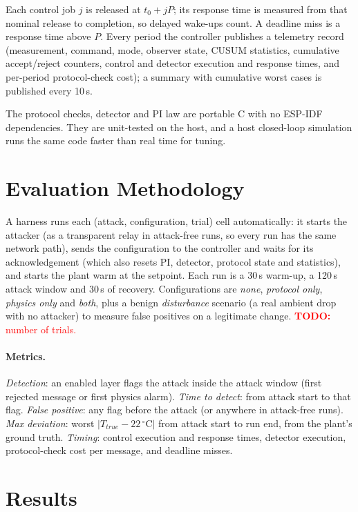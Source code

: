 \documentclass[10pt,twocolumn]{article}
\newcommand{\todo}[1]{\textcolor{red}{\textbf{TODO:} #1}}
\begin{document}
Each control job $j$ is released at $t_0 + jP$; its response time is measured
from that nominal release to completion, so delayed wake-ups count. A deadline
miss is a response time above $P$. Every period the controller publishes a
telemetry record (measurement, command, mode, observer state, CUSUM statistics,
cumulative accept/reject counters, control and detector execution and response
times, and per-period protocol-check cost); a summary with cumulative worst
cases is published every 10\,s.

The protocol checks, detector and PI law are portable C with no ESP-IDF
dependencies. They are unit-tested on the host, and a host closed-loop
simulation runs the same code faster than real time for tuning.

\section{Evaluation Methodology}
A harness runs each (attack, configuration, trial) cell automatically: it
starts the attacker (as a transparent relay in attack-free runs, so every run
has the same network path), sends the configuration to the controller and
waits for its acknowledgement (which also resets PI, detector, protocol state
and statistics), and starts the plant warm at the setpoint. Each run is a
30\,s warm-up, a 120\,s attack window and 30\,s of recovery. Configurations are
\emph{none}, \emph{protocol only}, \emph{physics only} and \emph{both}, plus a
benign \emph{disturbance} scenario (a real ambient drop with no attacker) to
measure false positives on a legitimate change. \todo{number of trials.}

\paragraph{Metrics.} \emph{Detection}: an enabled layer flags the attack inside
the attack window (first rejected message or first physics alarm).
\emph{Time to detect}: from attack start to that flag. \emph{False positive}:
any flag before the attack (or anywhere in attack-free runs). \emph{Max
deviation}: worst $|T_{true}-22\,^\circ\text{C}|$ from attack start to run end,
from the plant's ground truth. \emph{Timing}: control execution and response
times, detector execution, protocol-check cost per message, and deadline misses.

\section{Results}
\end{document}
